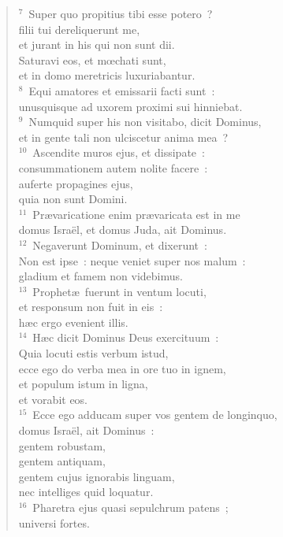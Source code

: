 \begin{flushleft}
\begin{verse}
${}^{7}$~Super quo propitius tibi esse potero~?\\ filii tui dereliquerunt me,\\ et jurant in his qui non sunt dii.\\ Saturavi eos, et mœchati sunt,\\ et in domo meretricis luxuriabantur.\\
${}^{8}$~Equi amatores et emissarii facti sunt~:\\ unusquisque ad uxorem proximi sui hinniebat.\\
${}^{9}$~Numquid super his non visitabo, dicit Dominus,\\ et in gente tali non ulciscetur anima mea~?\\
${}^{10}$~Ascendite muros ejus, et dissipate~:\\ consummationem autem nolite facere~:\\ auferte propagines ejus,\\ quia non sunt Domini.\\
${}^{11}$~Pr\ae varicatione enim pr\ae varicata est in me\\ domus Isra\"el, et domus Juda, ait Dominus.\\
${}^{12}$~Negaverunt Dominum, et dixerunt~:\\ Non est ipse~: neque veniet super nos malum~:\\ gladium et famem non videbimus.\\
${}^{13}$~Prophet\ae\ fuerunt in ventum locuti,\\ et responsum non fuit in eis~:\\ h\ae c ergo evenient illis.\\
${}^{14}$~H\ae c dicit Dominus Deus exercituum~:\\ Quia locuti estis verbum istud,\\ ecce ego do verba mea in ore tuo in ignem,\\ et populum istum in ligna,\\ et vorabit eos.\\
${}^{15}$~Ecce ego adducam super vos gentem de longinquo,\\ domus Isra\"el, ait Dominus~:\\ gentem robustam,\\ gentem antiquam,\\ gentem cujus ignorabis linguam,\\ nec intelliges quid loquatur.\\
${}^{16}$~Pharetra ejus quasi sepulchrum patens~;\\ universi fortes.\\

\end{verse}
\end{flushleft}

